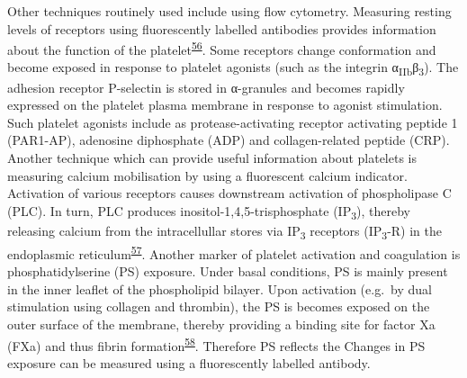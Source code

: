 \documentclass[11pt,twoside]{bristolthesis}
\begin{document}
Other techniques routinely used include using flow cytometry. Measuring resting levels of receptors using fluorescently labelled antibodies provides information about the function of the platelet\textsuperscript{\protect\hyperlink{ref-Hu2017}{56}}. Some receptors change conformation and become exposed in response to platelet agonists (such as the integrin α\textsubscript{IIb}β\textsubscript{3}). The adhesion receptor P-selectin is stored in α-granules and becomes rapidly expressed on the platelet plasma membrane in response to agonist stimulation. Such platelet agonists include as protease-activating receptor activating peptide 1 (PAR1-AP), adenosine diphosphate (ADP) and collagen-related peptide (CRP). Another technique which can provide useful information about platelets is measuring calcium mobilisation by using a fluorescent calcium indicator. Activation of various receptors causes downstream activation of phospholipase C (PLC). In turn, PLC produces inositol-1,4,5-trisphosphate (IP\textsubscript{3}), thereby releasing calcium from the intracellullar stores via IP\textsubscript{3} receptors (IP\textsubscript{3}-R) in the endoplasmic reticulum\textsuperscript{\protect\hyperlink{ref-Varga-Szabo2009}{57}}. Another marker of platelet activation and coagulation is phosphatidylserine (PS) exposure. Under basal conditions, PS is mainly present in the inner leaflet of the phospholipid bilayer. Upon activation (e.g.~by dual stimulation using collagen and thrombin), the PS is becomes exposed on the outer surface of the membrane, thereby providing a binding site for factor Xa (FXa) and thus fibrin formation\textsuperscript{\protect\hyperlink{ref-Bevers1983}{58}}. Therefore PS reflects the Changes in PS exposure can be measured using a fluorescently labelled antibody.
\end{document}
